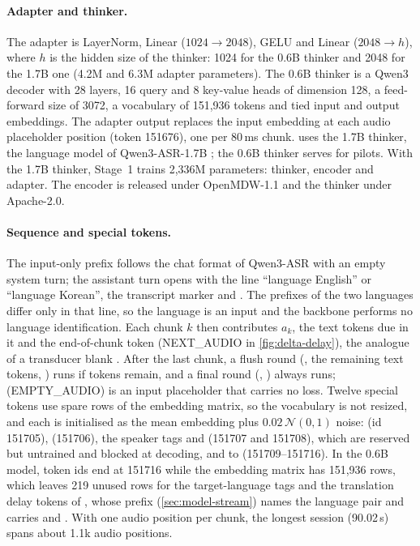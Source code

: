 \paragraph{Adapter and thinker.}
The adapter is LayerNorm, Linear ($1024\to2048$), GELU and Linear ($2048\to h$), where $h$ is the hidden size of the thinker: 1024 for the 0.6B thinker and 2048 for the 1.7B one (4.2M and 6.3M adapter parameters). The 0.6B thinker is a Qwen3 decoder with 28 layers, 16 query and 8 key-value heads of dimension 128, a feed-forward size of 3072, a vocabulary of 151,936 tokens and tied input and output embeddings. The adapter output replaces the input embedding at each audio placeholder position (token 151676), one per 80\,ms chunk. \model uses the 1.7B thinker, the language model of Qwen3-ASR-1.7B \citep{shi2026qwen3asr,xu2025qwen3omni}; the 0.6B thinker serves for pilots. With the 1.7B thinker, Stage~1 trains 2,336M parameters: thinker, encoder and adapter. The encoder is released under OpenMDW-1.1 and the thinker under Apache-2.0.

\paragraph{Sequence and special tokens.}
The input-only prefix follows the chat format of Qwen3-ASR with an empty system turn; the assistant turn opens with the line ``language English'' or ``language Korean'', the transcript marker and . The prefixes of the two languages differ only in that line, so the language is an input and the backbone performs no language identification. Each chunk $k$ then contributes $a_k$, the text tokens due in it and the end-of-chunk token  (NEXT\_AUDIO in \cref{fig:delta-delay}), the analogue of a transducer blank \citep{graves2012sequence,seide2024speech}. After the last chunk, a flush round (, the remaining text tokens, ) runs if tokens remain, and a final round (, ) always runs;  (EMPTY\_AUDIO) is an input placeholder that carries no loss. Twelve special tokens use spare rows of the embedding matrix, so the vocabulary is not resized, and each is initialised as the mean embedding plus $0.02\,\mathcal{N}(0,1)$ noise:  (id 151705),  (151706), the speaker tags  and  (151707 and 151708), which are reserved but untrained and blocked at decoding, and  to  (151709--151716). In the 0.6B model, token ids end at 151716 while the embedding matrix has 151,936 rows, which leaves 219 unused rows for the target-language tags and the translation delay tokens of \model, whose prefix (\cref{sec:model-stream}) names the language pair and carries  and . With one audio position per chunk, the longest \taxi session (90.02\,s) spans about 1.1k audio positions.

